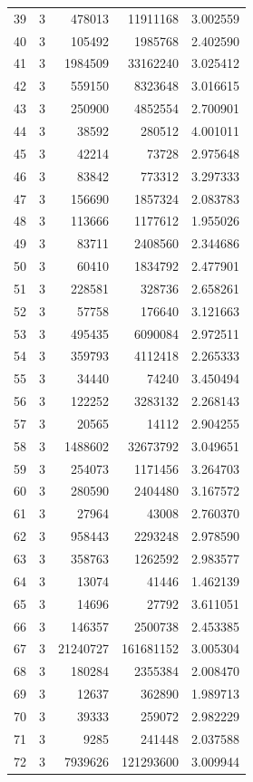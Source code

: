 \begin{longtable}{rrrrr}
39 & 3 & 478013 & 11911168 & 3.002559\\
40 & 3 & 105492 & 1985768 & 2.402590\\
41 & 3 & 1984509 & 33162240 & 3.025412\\
42 & 3 & 559150 & 8323648 & 3.016615\\
43 & 3 & 250900 & 4852554 & 2.700901\\
44 & 3 & 38592 & 280512 & 4.001011\\
45 & 3 & 42214 & 73728 & 2.975648\\
46 & 3 & 83842 & 773312 & 3.297333\\
47 & 3 & 156690 & 1857324 & 2.083783\\
48 & 3 & 113666 & 1177612 & 1.955026\\
49 & 3 & 83711 & 2408560 & 2.344686\\
50 & 3 & 60410 & 1834792 & 2.477901\\
51 & 3 & 228581 & 328736 & 2.658261\\
52 & 3 & 57758 & 176640 & 3.121663\\
53 & 3 & 495435 & 6090084 & 2.972511\\
54 & 3 & 359793 & 4112418 & 2.265333\\
55 & 3 & 34440 & 74240 & 3.450494\\
56 & 3 & 122252 & 3283132 & 2.268143\\
57 & 3 & 20565 & 14112 & 2.904255\\
58 & 3 & 1488602 & 32673792 & 3.049651\\
59 & 3 & 254073 & 1171456 & 3.264703\\
60 & 3 & 280590 & 2404480 & 3.167572\\
61 & 3 & 27964 & 43008 & 2.760370\\
62 & 3 & 958443 & 2293248 & 2.978590\\
63 & 3 & 358763 & 1262592 & 2.983577\\
64 & 3 & 13074 & 41446 & 1.462139\\
65 & 3 & 14696 & 27792 & 3.611051\\
66 & 3 & 146357 & 2500738 & 2.453385\\
67 & 3 & 21240727 & 161681152 & 3.005304\\
68 & 3 & 180284 & 2355384 & 2.008470\\
69 & 3 & 12637 & 362890 & 1.989713\\
70 & 3 & 39333 & 259072 & 2.982229\\
71 & 3 & 9285 & 241448 & 2.037588\\
72 & 3 & 7939626 & 121293600 & 3.009944\\

\end{longtable}
